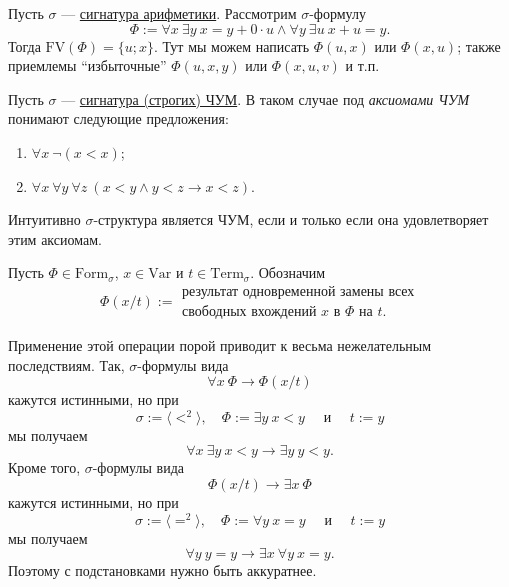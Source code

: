 \documentclass[12pt,a4paper]{article}
\newcommand{\Formul}{\ensuremath{\mathrm{Form}}\xspace}
\newcommand{\Var}{\ensuremath{\mathrm{Var}}\xspace}
\newcommand{\Term}{\ensuremath{\mathrm{Term}}\xspace}
\newcommand{\FV}{\ensuremath{\mathrm{FV}}\xspace}
\begin{document}
    \begin{example}    
        Пусть $\sigma$ --- \hyperlink{R-signature-definition}{сигнатура арифметики}. Рассмотрим $\sigma$-формулу
        \[\Phi := \forall x\ \exists y\ x = y + 0 \cdot u \wedge \forall y\ \exists u\ x + u = y.\]
        Тогда $\FV(\Phi) = \{u; x\}$. Тут мы можем написать $\Phi(u, x)$ или $\Phi(x, u)$; также приемлемы ``избыточные'' $\Phi(u, x, y)$ или $\Phi(x, u, v)$ и т.п.
    \end{example}

    \begin{example}
        Пусть $\sigma$ --- \hyperlink{strict-POS-signature-definition}{сигнатура (строгих) ЧУМ}. В таком случае под \emph{аксиомами ЧУМ} понимают следующие предложения:
        \begin{enumerate}
            \item $\forall x\ \neg (x < x)$;
            \item $\forall x\ \forall y\ \forall z\ (x < y \wedge y < z \rightarrow x < z)$.
        \end{enumerate}

        Интуитивно $\sigma$-структура является ЧУМ, если и только если она удовлетворяет этим аксиомам.
    \end{example}

    \begin{definition}
        Пусть $\Phi \in \Formul_\sigma$, $x \in \Var$ и $t \in \Term_\sigma$. Обозначим
        \[
            \Phi(x/t) :=
            \begin{gathered}
                \text{результат одновременной замены всех}\\
                \text{свободных вхождений $x$ в $\Phi$ на $t$.}
            \end{gathered}
        \]
    \end{definition}

    \begin{remark*}
        Применение этой операции порой приводит к весьма нежелательным последствиям. Так, $\sigma$-формулы вида
        \[\forall x\ \Phi \rightarrow \Phi(x/t)\]
        кажутся истинными, но при
        \[
            \sigma := \langle {<}^2 \rangle,
            \quad
            \Phi := \exists y\ x < y
            \quad \text{ и } \quad
            t := y
        \]
        мы получаем
        \[\forall x\ \exists y\ x < y \rightarrow \exists y\ y < y.\]
        Кроме того, $\sigma$-формулы вида
        \[\Phi(x/t) \rightarrow \exists x\ \Phi\]
        кажутся истинными, но при
        \[
            \sigma := \langle {=}^2 \rangle,
            \quad
            \Phi := \forall y\ x = y
            \quad \text{ и } \quad
            t := y
        \]
        мы получаем
        \[\forall y\ y = y \rightarrow \exists x\ \forall y\ x = y.\]
        Поэтому с подстановками нужно быть аккуратнее.
    \end{remark*}
\end{document}
